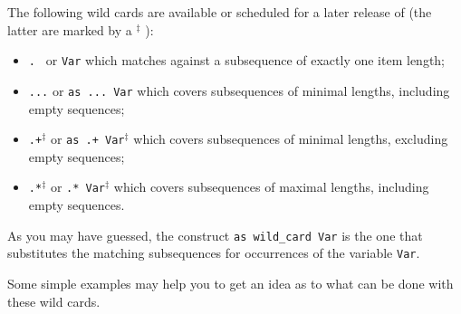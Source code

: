 The following wild cards are available or scheduled for a later release of \kir (the latter are
marked by a $^\ddagger$ ):
\begin{itemize}
\item  {\tt .  } or {\tt Var} which matches against a subsequence of exactly one item
length;
\item  {\tt ...} or {\tt as ... Var} which covers  subsequences of minimal lengths,
including empty sequences;
\item  {\tt .+}$^\ddagger$  or {\tt as .+ Var}$^\ddagger$ which covers  subsequences of minimal lengths, excluding
empty sequences;
\item {\tt .*}$^\ddagger$ or {\tt .* Var}$^\ddagger$ which covers subsequences of maximal lengths, including empty sequences.
\end{itemize}
As you may have guessed, the construct {\tt as wild\_card Var} is the one that substitutes
 the matching subsequences for occurrences of the variable {\tt Var}. 

Some simple examples may help you to get an idea as to what can be done with these wild cards.

